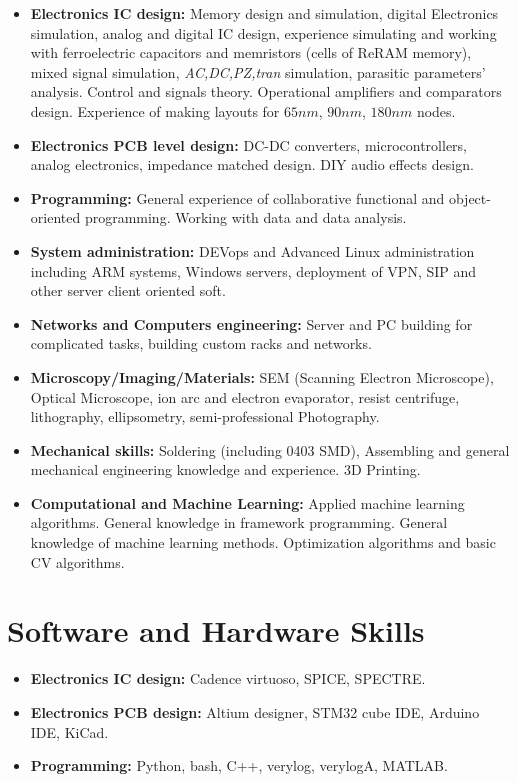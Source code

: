 \documentclass{article}
\begin{document}
\begin{itemize}
\item \textbf{Electronics IC design:} Memory design and simulation, digital Electronics simulation, analog and digital IC design, experience simulating and working with ferroelectric capacitors and memristors (cells of ReRAM memory),   mixed signal simulation, \textit{AC,DC,PZ,tran} simulation, parasitic parameters' analysis. Control and signals theory. Operational amplifiers and comparators design. Experience of making layouts for $65 nm$, $90nm$, $180nm$ nodes. 
\item \textbf{Electronics PCB level design:} DC-DC converters, microcontrollers, analog electronics, impedance matched design. DIY audio effects design. 
\item \textbf{Programming:} General experience of collaborative functional and object-oriented programming. Working with data and data analysis.
\item \textbf{System administration:} DEVops and Advanced Linux administration including ARM systems, Windows servers, deployment of VPN, SIP and other server client oriented soft.
\item \textbf{Networks and Computers engineering:} Server and PC building for complicated tasks, building custom racks and networks.
\item \textbf{Microscopy/Imaging/Materials:} SEM (Scanning Electron Microscope), Optical Microscope, ion arc and electron evaporator, resist centrifuge, lithography, ellipsometry, semi-professional Photography.
\item \textbf{Mechanical skills:} Soldering (including 0403 SMD), Assembling and general mechanical engineering knowledge and experience. 3D Printing.
\item \textbf{Computational and Machine Learning:} Applied machine learning algorithms. General knowledge in framework programming. General knowledge of machine learning methods. Optimization algorithms and basic CV algorithms.
\end{itemize}
 
\section{Software and Hardware Skills}
\begin{itemize}
\item \textbf{Electronics IC design:} Cadence virtuoso, SPICE, SPECTRE.
\item \textbf{Electronics PCB design:} Altium designer, STM32 cube IDE, Arduino IDE, KiCad.
\item \textbf{Programming:} Python, bash, C++, verylog, verylogA, MATLAB.
\end{itemize}
 
\end{document}
